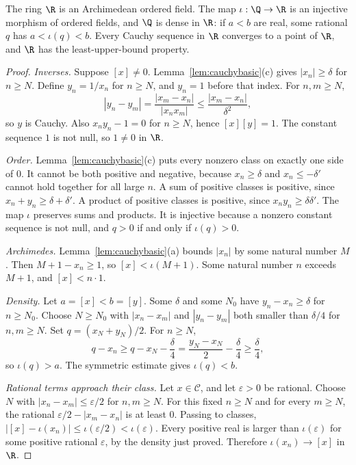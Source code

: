 \begin{theorem}\label{thm:reals}
The ring $\R$ is an Archimedean ordered field. The map $\iota:\Q\to\R$ is an injective morphism of ordered fields, and $\Q$ is dense in $\R$: if $a<b$ are real, some rational $q$ has $a<\iota(q)<b$. Every Cauchy sequence in $\R$ converges to a point of $\R$, and $\R$ has the least-upper-bound property.
\end{theorem}
\begin{proof}
\emph{Inverses.} Suppose $[x]\ne 0$. Lemma~\ref{lem:cauchybasic}(c) gives $|x_n|\ge\delta$ for $n\ge N$. Define $y_n=1/x_n$ for $n\ge N$, and $y_n=1$ before that index. For $n,m\ge N$,
\[
|y_n-y_m|=\frac{|x_m-x_n|}{|x_nx_m|}\le\frac{|x_m-x_n|}{\delta^2},
\]
so $y$ is Cauchy. Also $x_ny_n-1=0$ for $n\ge N$, hence $[x][y]=1$. The constant sequence $1$ is not null, so $1\ne 0$ in $\R$.

\emph{Order.} Lemma~\ref{lem:cauchybasic}(c) puts every nonzero class on exactly one side of $0$. It cannot be both positive and negative, because $x_n\ge\delta$ and $x_n\le-\delta'$ cannot hold together for all large $n$. A sum of positive classes is positive, since $x_n+y_n\ge\delta+\delta'$. A product of positive classes is positive, since $x_ny_n\ge\delta\delta'$. The map $\iota$ preserves sums and products. It is injective because a nonzero constant sequence is not null, and $q>0$ if and only if $\iota(q)>0$.

\emph{Archimedes.} Lemma~\ref{lem:cauchybasic}(a) bounds $|x_n|$ by some natural number $M$. Then $M+1-x_n\ge 1$, so $[x]<\iota(M+1)$. Some natural number $n$ exceeds $M+1$, and $[x]<n\cdot 1$.

\emph{Density.} Let $a=[x]<b=[y]$. Some $\delta$ and some $N_0$ have $y_n-x_n\ge\delta$ for $n\ge N_0$. Choose $N\ge N_0$ with $|x_n-x_m|$ and $|y_n-y_m|$ both smaller than $\delta/4$ for $n,m\ge N$. Set $q=(x_N+y_N)/2$. For $n\ge N$,
\[
q-x_n\ge q-x_N-\frac{\delta}{4}=\frac{y_N-x_N}{2}-\frac{\delta}{4}\ge\frac{\delta}{4},
\]
so $\iota(q)>a$. The symmetric estimate gives $\iota(q)<b$.

\emph{Rational terms approach their class.} Let $x\in\mathcal C$, and let $\varepsilon>0$ be rational. Choose $N$ with $|x_n-x_m|\le\varepsilon/2$ for $n,m\ge N$. For this fixed $n\ge N$ and for every $m\ge N$, the rational $\varepsilon/2-|x_m-x_n|$ is at least $0$. Passing to classes, $|[x]-\iota(x_n)|\le\iota(\varepsilon/2)<\iota(\varepsilon)$. Every positive real is larger than $\iota(\varepsilon)$ for some positive rational $\varepsilon$, by the density just proved. Therefore $\iota(x_n)\to[x]$ in $\R$.


\end{proof}
